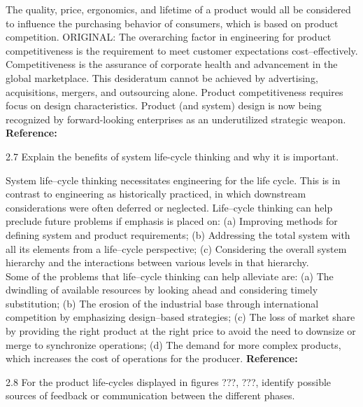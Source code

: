 \begin{exsol@solution}{}
        The quality, price, ergonomics, and lifetime of a product would all be considered to influence the purchasing behavior of consumers, which is based on product competition. ORIGINAL: The overarching factor in engineering for product competitiveness is the requirement to meet customer expectations cost–effectively. Competitiveness is the assurance of corporate health and advancement in the global marketplace. This desideratum cannot be achieved by advertising, acquisitions, mergers, and outsourcing alone. Product competitiveness requires focus on design characteristics. Product (and system) design is now being recognized by forward-looking enterprises as an underutilized strategic weapon. \textbf{Reference:}
\end{exsol@solution}
\begin{exsol@exercise}{2.7}
    \label{sea-2-10}
        Explain the benefits of system life-cycle thinking and why it is important.
\end{exsol@exercise}
\begin{exsol@solution}{}
        System life–cycle thinking necessitates engineering for the life cycle. This is in contrast to engineering as historically practiced, in which downstream considerations were often deferred or neglected. Life–cycle thinking can help preclude future problems if emphasis is placed on: (a) Improving methods for defining system and product requirements; (b) Addressing the total system with all its elements from a life–cycle perspective; (c) Considering the overall system hierarchy and the interactions between various levels in that hierarchy.\\
        Some of the problems that life–cycle thinking can help alleviate are: (a) The dwindling of available resources by looking ahead and considering timely substitution; (b) The erosion of the industrial base through international competition by emphasizing design–based strategies; (c) The loss of market share by providing the right product at the right price to avoid the need to downsize or merge to synchronize operations; (d) The demand for more complex products, which increases the cost of operations for the producer. \textbf{Reference:}
\end{exsol@solution}
\begin{exsol@exercise}{2.8}
    \label{sea-2-11}
        For the product life-cycles displayed in figures ???, ???, identify possible sources of feedback or communication between the different phases.
\end{exsol@exercise}
